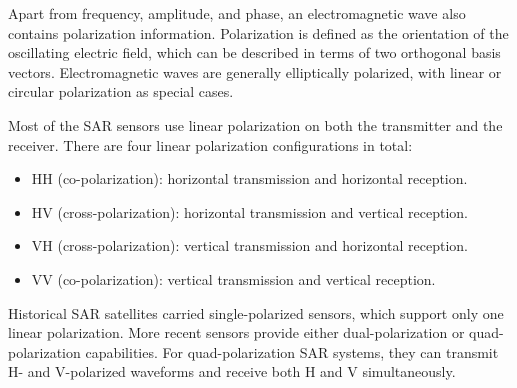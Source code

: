 Apart from frequency, amplitude, and phase, an electromagnetic wave also contains polarization information.
Polarization is defined as the orientation of the oscillating electric field, which can be described in terms of two orthogonal basis vectors.
Electromagnetic waves are generally elliptically polarized, with linear or circular polarization as special cases.

Most of the SAR sensors use linear polarization on both the transmitter and the receiver. 
There are four linear polarization configurations in total:
\begin{itemize}
	\item HH (co-polarization): horizontal transmission and horizontal reception.
	\item HV (cross-polarization): horizontal transmission and vertical reception.
	\item VH (cross-polarization): vertical transmission and horizontal reception.
	\item VV (co-polarization): vertical transmission and vertical reception.
\end{itemize}
Historical SAR satellites carried single-polarized sensors, which support only one linear polarization. More recent sensors provide either dual-polarization
or quad-polarization capabilities. 
For quad-polarization SAR systems, they can transmit H- and V-polarized waveforms and receive both H and V simultaneously.

